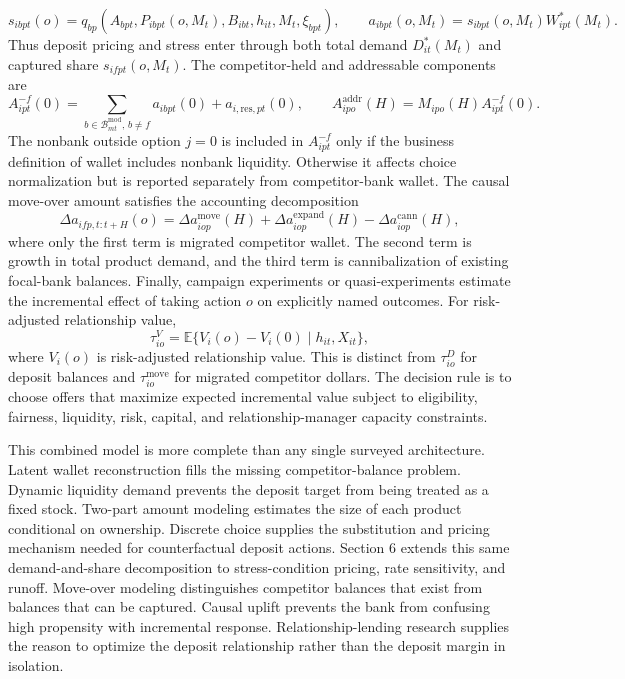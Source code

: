 \documentclass[11pt]{article}
\begin{document}
\[
  s_{ibpt}(o)
  =
  q_{bp}(A_{bpt},P_{ibpt}(o,M_t),B_{ibt},h_{it},M_t,\xi_{bpt}),
  \qquad
  a_{ibpt}(o,M_t)=s_{ibpt}(o,M_t)W_{ipt}^{*}(M_t).
\]
Thus deposit pricing and stress enter through both total demand
$D_{it}^{*}(M_t)$ and captured share $s_{ifpt}(o,M_t)$.
The competitor-held and addressable components are
\[
  A_{ipt}^{-f}(0)=
  \sum_{b\in\mathcal{B}_{mt}^{\mathrm{mod}},\,b\neq f}a_{ibpt}(0)
  +a_{i,\mathrm{res},pt}(0),
  \qquad
  A_{ipo}^{\mathrm{addr}}(H)=M_{ipo}(H)A_{ipt}^{-f}(0).
\]
The nonbank outside option $j=0$ is included in $A_{ipt}^{-f}$ only if the
business definition of wallet includes nonbank liquidity. Otherwise it affects
choice normalization but is reported separately from competitor-bank wallet.
The causal move-over amount satisfies the accounting decomposition
\[
  \Delta a_{ifp,t:t+H}(o)
  =
  \Delta a_{iop}^{\mathrm{move}}(H)
  +\Delta a_{iop}^{\mathrm{expand}}(H)
  -\Delta a_{iop}^{\mathrm{cann}}(H),
\]
where only the first term is migrated competitor wallet. The second term is
growth in total product demand, and the third term is cannibalization of
existing focal-bank balances.
Finally, campaign experiments or quasi-experiments estimate the incremental
effect of taking action $o$ on explicitly named outcomes. For risk-adjusted
relationship value,
\[
  \tau_{io}^{V}
  =
  \mathbb{E}\{V_i(o)-V_i(0)\mid h_{it},X_{it}\},
\]
where $V_i(o)$ is risk-adjusted relationship value. This is distinct from
$\tau_{io}^{D}$ for deposit balances and $\tau_{io}^{\mathrm{move}}$ for
migrated competitor dollars. The decision rule is to
choose offers that maximize expected incremental value subject to eligibility,
fairness, liquidity, risk, capital, and relationship-manager capacity
constraints.

This combined model is more complete than any single surveyed architecture.
Latent wallet reconstruction fills the missing competitor-balance problem.
Dynamic liquidity demand prevents the deposit target from being treated as a
fixed stock. Two-part amount modeling estimates the size of each product
conditional on ownership. Discrete choice supplies the substitution and pricing
mechanism needed for counterfactual deposit actions. Section 6 extends this
same demand-and-share decomposition to stress-condition pricing, rate
sensitivity, and runoff. Move-over modeling distinguishes
competitor balances that exist from balances that can be captured. Causal
uplift prevents the bank from confusing high propensity with incremental
response. Relationship-lending research supplies the reason to optimize the
deposit relationship rather than the deposit margin in isolation.
\end{document}
